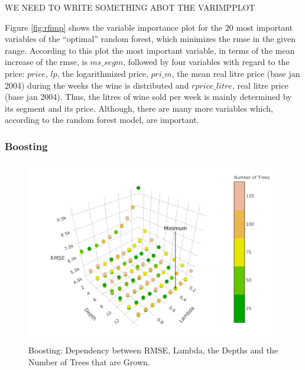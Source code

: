 \documentclass[11pt,]{article}
\begin{document}
WE NEED TO WRITE SOMETHING ABOT THE VARIMPPLOT

Figure \ref{fig:rfimp} shows the variable importance plot for the \(20\)
most important variables of the \enquote{optimal} random forest, which
minimizes the \ac{rmse} in the given range. According to this plot the
most important variable, in terms of the mean increase of the \ac{rmse},
is \(ms\_segm\), followed by four variables with regard to the price:
\(price\), \(lp\), the logarithmized price, \(pri\_m\), the mean real
litre price (base jan 2004) during the weeks the wine is distributed and
\(rprice\_litre\), real litre price (base jan 2004). Thus, the litres of
wine sold per week is mainly determined by its segment and its price.
Although, there are many more variables which, according to the random
forest model, are important.

\hypertarget{boosting}{%
\subsubsection{Boosting}\label{boosting}}

\begin{figure}

{\centering \includegraphics{../00_data/output_paper/11_boosting_plot} 

}

\caption[RMSEs of the Boosting Model for Different Parameters]{\label{fig:boostrmse}Boosting: Dependency between RMSE, Lambda, the Depths and the Number of Trees that are Grown.}\label{fig:boosting_hyper}
\end{figure}
\end{document}
